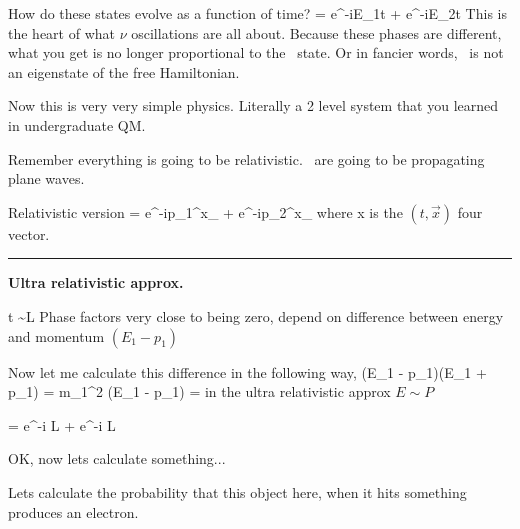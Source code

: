 {How do these states evolve as a function of time?
\be
{} = \cos\theta e^{-iE_1t} \ket{\nuone} + \sin\theta e^{-iE_2t}\ket{\nutwo}
\ee
This is the heart of what $\nu$ oscillations are all about. 
Because these phases are different, what you get is no longer proportional to the \nue\ state.
Or in fancier words, \nue\ is not an eigenstate of the free Hamiltonian.

Now this is very very simple physics. 
Literally a 2 level system that you learned in undergraduate QM.


Remember everything is going to be relativistic. 
\nus\ are going to be propagating plane waves. 

Relativistic version 
\be
{} = \cos\theta e^{-ip_1^\mu x_\mu} \ket{\nuone} + \sin\theta e^{-ip_2^\mu x_\mu}\ket{\nutwo}
\ee
where x is the $(t,\vec{x})$ four vector. 

\noindent\rule{\textwidth}{1pt}

\textbf{Ultra relativistic approx. }

\be
t \sim L 
\ee
Phase factors very close to being zero, depend on difference between energy and momentum $(E_1 - p_1)$


Now let me calculate this difference in the following way,
\be
(E_1 - p_1)(E_1 + p_1) = m_1^2  \Rightarrow  (E_1 - p_1) =  
\ee
in the ultra relativistic approx $E \sim P$


\be
{} = \cos\theta e^{-i  L} \ket{\nuone} + \sin\theta e^{-i  L} \ket{\nutwo}
\ee

OK, now lets calculate something...


Lets calculate the probability that this object here, when it hits something produces an electron. 

}
